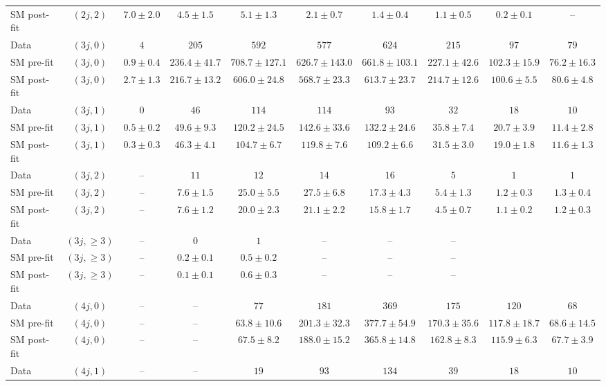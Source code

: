 {\begin{table}[h!]
{\begin{tabular}{lccccccccc}
 SM post-fit & $(2j,2)$ & $7.0\pm2.0$ & $4.5\pm1.5$ & $5.1\pm1.3$ & $2.1\pm0.7$ & $1.4\pm0.4$ & $1.1\pm0.5$ & $0.2\pm0.1$ & -- \\[0.5ex]
 Data & $(3j,0)$ & $4$ & $205$ & $592$ & $577$ & $624$ & $215$ & $97$ & $79$ \\[0.5ex]
 SM pre-fit & $(3j,0)$ & $0.9\pm0.4$ & $236.4\pm41.7$ & $708.7\pm127.1$ & $626.7\pm143.0$ & $661.8\pm103.1$ & $227.1\pm42.6$ & $102.3\pm15.9$ & $76.2\pm16.3$ \\[0.5ex]
 SM post-fit & $(3j,0)$ & $2.7\pm1.3$ & $216.7\pm13.2$ & $606.0\pm24.8$ & $568.7\pm23.3$ & $613.7\pm23.7$ & $214.7\pm12.6$ & $100.6\pm5.5$ & $80.6\pm4.8$ \\[0.5ex]
 Data & $(3j,1)$ & $0$ & $46$ & $114$ & $114$ & $93$ & $32$ & $18$ & $10$ \\[0.5ex]
 SM pre-fit & $(3j,1)$ & $0.5\pm0.2$ & $49.6\pm9.3$ & $120.2\pm24.5$ & $142.6\pm33.6$ & $132.2\pm24.6$ & $35.8\pm7.4$ & $20.7\pm3.9$ & $11.4\pm2.8$ \\[0.5ex]
 SM post-fit & $(3j,1)$ & $0.3\pm0.3$ & $46.3\pm4.1$ & $104.7\pm6.7$ & $119.8\pm7.6$ & $109.2\pm6.6$ & $31.5\pm3.0$ & $19.0\pm1.8$ & $11.6\pm1.3$ \\[0.5ex]
 Data & $(3j,2)$ & -- & $11$ & $12$ & $14$ & $16$ & $5$ & $1$ & $1$ \\[0.5ex]
 SM pre-fit & $(3j,2)$ & -- & $7.6\pm1.5$ & $25.0\pm5.5$ & $27.5\pm6.8$ & $17.3\pm4.3$ & $5.4\pm1.3$ & $1.2\pm0.3$ & $1.3\pm0.4$ \\[0.5ex]
 SM post-fit & $(3j,2)$ & -- & $7.6\pm1.2$ & $20.0\pm2.3$ & $21.1\pm2.2$ & $15.8\pm1.7$ & $4.5\pm0.7$ & $1.1\pm0.2$ & $1.2\pm0.3$ \\[0.5ex]
 Data & $(3j,\geq 3)$ & -- & $0$ & $1$ & -- & -- & -- \\[0.5ex]
 SM pre-fit & $(3j,\geq 3)$ & -- & $0.2\pm0.1$ & $0.5\pm0.2$ & -- & -- & -- \\[0.5ex]
 SM post-fit & $(3j,\geq 3)$ & -- & $0.1\pm0.1$ & $0.6\pm0.3$ & -- & -- & -- \\[0.5ex]
 Data & $(4j,0)$ & -- & -- & $77$ & $181$ & $369$ & $175$ & $120$ & $68$ \\[0.5ex]
 SM pre-fit & $(4j,0)$ & -- & -- & $63.8\pm10.6$ & $201.3\pm32.3$ & $377.7\pm54.9$ & $170.3\pm35.6$ & $117.8\pm18.7$ & $68.6\pm14.5$ \\[0.5ex]
 SM post-fit & $(4j,0)$ & -- & -- & $67.5\pm8.2$ & $188.0\pm15.2$ & $365.8\pm14.8$ & $162.8\pm8.3$ & $115.9\pm6.3$ & $67.7\pm3.9$ \\[0.5ex]
 Data & $(4j,1)$ & -- & -- & $19$ & $93$ & $134$ & $39$ & $18$ & $10$ \\[0.5ex]

\end{tabular}}
\end{table}}
